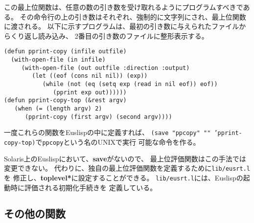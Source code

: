 この最上位関数は、任意の数の引き数を受け取れるようにプログラムすべきである。
その命令行の上の引き数はそれぞれ、強制的に文字列にされ、最上位関数に渡される。
以下に示すプログラムは、最初の引き数に与えられたファイルからくり返し読み込み、
2番目の引き数のファイルに整形表示する。

\begin{verbatim}
(defun pprint-copy (infile outfile)
  (with-open-file (in infile)
     (with-open-file (out outfile :direction :output)
        (let ((eof (cons nil nil)) (exp))
           (while (not (eq (setq exp (read in nil eof)) eof))
              (pprint exp out))))))
(defun pprint-copy-top (&rest argv)
   (when (= (length argv) 2)
      (pprint-copy (first argv) (second argv))))
\end{verbatim}

一度これらの関数をEuslispの中に定義すれば、
{\tt (save "ppcopy" "" 'pprint-copy-top)}で{\tt ppcopy}という名のUNIXで実行
可能な命令を作る。

Solaris上のEuslispにおいて、{\bf save}がないので、
最上位評価関数はこの手法では変更できない。
代わりに、独自の最上位評価関数を定義するために{\tt lib/eusrt.l}を
修正し、{\bf *toplevel*}に設定することができる。
{\tt lib/eusrt.l}には、Euslispの起動時に評価される初期化手続きを
定義している。

\subsection{その他の関数}

\begin{refdesc}



\end{refdesc}

\newpage
